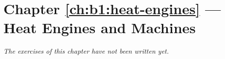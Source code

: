 \section*{Chapter \ref{ch:b1:heat-engines} --- Heat Engines and Machines}


\emph{The exercises of this chapter have not been written yet.}
